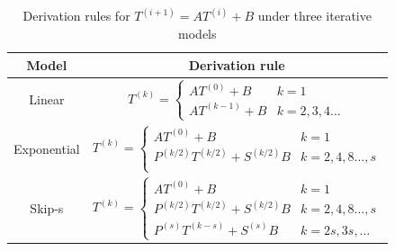 





\begin{table}[t]
    \centering
    \begin{tabular}{|c|c|}\hline
        Model & Derivation rule \\ \hline
        Linear & $T^{(k)}=
\begin{cases}
AT^{(0)} + B& k=1\\
AT^{(k-1)} + B & k=2,3,4\dots
\end{cases}$\\ \hline
        Exponential & $T^{(k)}=
\begin{cases}
AT^{(0)} + B& k=1\\
P^{(k/2)}T^{(k/2)} + S^{(k/2)}B & k=2,4,8\dots,s\\
\end{cases}$\\ \hline
        Skip-s &$T^{(k)}=
\begin{cases}
AT^{(0)} + B& k=1\\
P^{(k/2)}T^{(k/2)} + S^{(k/2)}B & k=2,4,8\dots,s\\
P^{(s)}T^{(k-s)} + S^{(s)}B & k = 2s, 3s, \dots
\end{cases}$\\ \hline
    \end{tabular}
    \caption{Derivation rules for $T^{(i+1)} = AT^{(i)} + B$ under three iterative models}
    \label{tab:derivation_rule}
\end{table}

